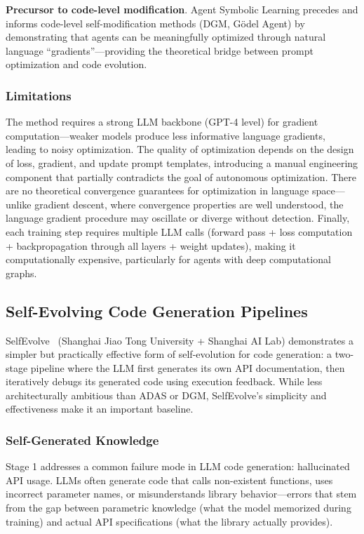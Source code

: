 \textbf{Precursor to code-level modification}. Agent Symbolic Learning precedes and informs code-level self-modification methods (DGM, G\"odel Agent) by demonstrating that agents can be meaningfully optimized through natural language ``gradients''---providing the theoretical bridge between prompt optimization and code evolution.

\subsubsection{Limitations}

The method requires a strong LLM backbone (GPT-4 level) for gradient computation---weaker models produce less informative language gradients, leading to noisy optimization. The quality of optimization depends on the design of loss, gradient, and update prompt templates, introducing a manual engineering component that partially contradicts the goal of autonomous optimization. There are no theoretical convergence guarantees for optimization in language space---unlike gradient descent, where convergence properties are well understood, the language gradient procedure may oscillate or diverge without detection. Finally, each training step requires multiple LLM calls (forward pass + loss computation + backpropagation through all layers + weight updates), making it computationally expensive, particularly for agents with deep computational graphs.

\subsection{Self-Evolving Code Generation Pipelines}
\label{sec:selfevolve}

SelfEvolve~\citep{jiang2023selfevolve} (Shanghai Jiao Tong University + Shanghai AI Lab) demonstrates a simpler but practically effective form of self-evolution for code generation: a two-stage pipeline where the LLM first generates its own API documentation, then iteratively debugs its generated code using execution feedback. While less architecturally ambitious than ADAS or DGM, SelfEvolve's simplicity and effectiveness make it an important baseline.

\subsubsection{Self-Generated Knowledge}

Stage 1 addresses a common failure mode in LLM code generation: hallucinated API usage. LLMs often generate code that calls non-existent functions, uses incorrect parameter names, or misunderstands library behavior---errors that stem from the gap between parametric knowledge (what the model memorized during training) and actual API specifications (what the library actually provides).

